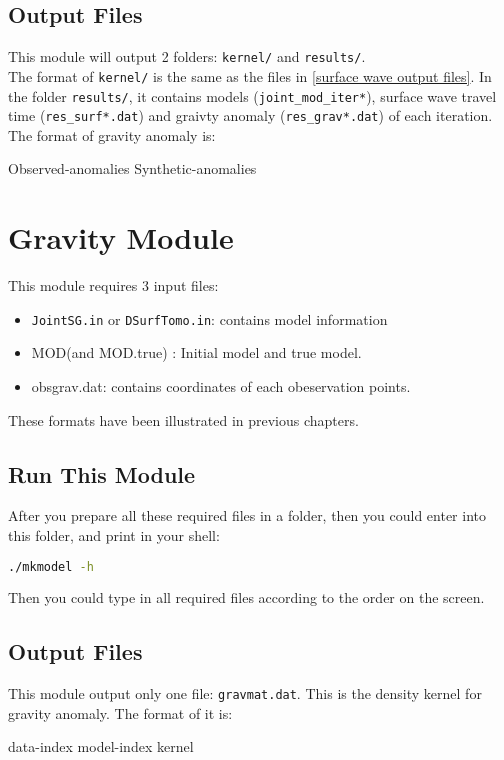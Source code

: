 \documentclass[UTF8]{article}
\begin{document}
    \subsection{Output Files}
    This module will output 2 folders: \verb!kernel/! and \verb!results/!. \\

    The format of \verb!kernel/! is the same as the files in \ref{surface wave output files}.
    In the folder \verb!results/!, it contains models (\verb!joint_mod_iter*!), 
    surface wave travel time (\verb!res_surf*.dat!) and graivty anomaly (\verb!res_grav*.dat!) 
    of each iteration. The format of gravity anomaly is:
    \begin{center}
        Observed-anomalies Synthetic-anomalies
    \end{center}

    \section{Gravity Module}
    This module requires 3 input files:
    \begin{itemize}
        \item \verb!JointSG.in! or \verb!DSurfTomo.in!: contains model information
        \item MOD(and MOD.true) : Initial model and true model.
        \item obsgrav.dat: contains coordinates of each obeservation points.
    \end{itemize}
    These formats have been illustrated in previous chapters.

    \subsection{Run This Module}
    After you prepare all these required files in a folder, then you could enter into this folder,
    and print in your shell:
    \begin{lstlisting}[language=bash]
    ./mkmodel -h
    \end{lstlisting}
    Then you could type in all required files according to the order on the screen.

    \subsection{Output Files}
    This module output only one file: \verb!gravmat.dat!. This is the density kernel 
    for gravity anomaly. The format of it is:
    \begin{center}
        data-index model-index kernel
    \end{center}
\end{document}
